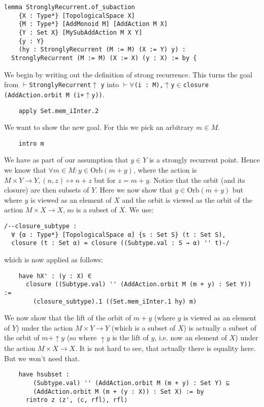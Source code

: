 \documentclass[11pt]{article}
\theoremstyle{definition}              %
\theoremstyle{definition}              %
\theoremstyle{definition}              %
\begin{document}
\begin{lstlisting}
lemma StronglyRecurrent.of_subaction
    {X : Type*} [TopologicalSpace X]
    {M : Type*} [AddMonoid M] [AddAction M X]
    {Y : Set X} [MySubAddAction M X Y]
    {y : Y}
    (hy : StronglyRecurrent (M := M) (X := Y) y) :
  StronglyRecurrent (M := M) (X := X) (y : X) := by {

\end{lstlisting}
We begin by writing out the definition of strong recurrence. This turns the goal from $\vdash$\verb|StronglyRecurrent|$\uparrow$ \verb|y| into $\vdash \forall$\verb|(i : M),|$\uparrow$\verb|y|$\in$\verb|closure (AddAction.orbit M (i+|$\uparrow$\verb|y))|.
\begin{lstlisting}
    apply Set.mem_iInter.2
\end{lstlisting}
We want to show the new goal. For this we pick an arbitrary $m \in M$.
\begin{lstlisting}
    intro m
\end{lstlisting}
We have as part of our assumption that $y \in Y$ is a strongly recurrent point. Hence we know that $\forall m \in M:y \in  \overline{\text{Orb}(m+y)}$, where the action is $M \times Y \to Y, (n,z) \mapsto n+z$ but for $z=m+y$. Notice that the orbit (and its closure) are then subsets of $Y$. Here we now show that $y \in \overline{\text{Orb}(m+y)}$ but where $y$ is viewed as an element of $X$ and the orbit is viewed as the orbit of the action $M \times X \to X$, so is a subset of $X$. We use:
\begin{lstlisting}
/--closure_subtype :
  ∀ {α : Type*} [TopologicalSpace α] {s : Set S} (t : Set S),
  closure (t : Set α) = closure ((Subtype.val : S → α) '' t)-/
\end{lstlisting}
which is now applied as follows:
\begin{lstlisting}
    have hX' : (y : X) ∈
      closure ((Subtype.val) '' (AddAction.orbit M (m + y) : Set Y)) :=
        (closure_subtype).1 ((Set.mem_iInter.1 hy) m)
\end{lstlisting}
We now show that the lift of the orbit of $m+y$ (where $y$ is viewed as an element of $Y$) under the action $M \times Y \to Y$ (which is a subset of $X$) is actually a subset of the orbit of $m+\uparrow y$ (so where $\uparrow y$ is the lift of $y$, i.e. now an element of $X$) under the action $M \times X \to X$. It is not hard to see, that actually there is equality here. But we won't need that.
\begin{lstlisting}
    have hsubset :
        (Subtype.val) '' (AddAction.orbit M (m + y) : Set Y) ⊆
        (AddAction.orbit M (m + (y : X)) : Set X) := by
      rintro z ⟨z', ⟨c, rfl⟩, rfl⟩
\end{lstlisting}
\end{document}
